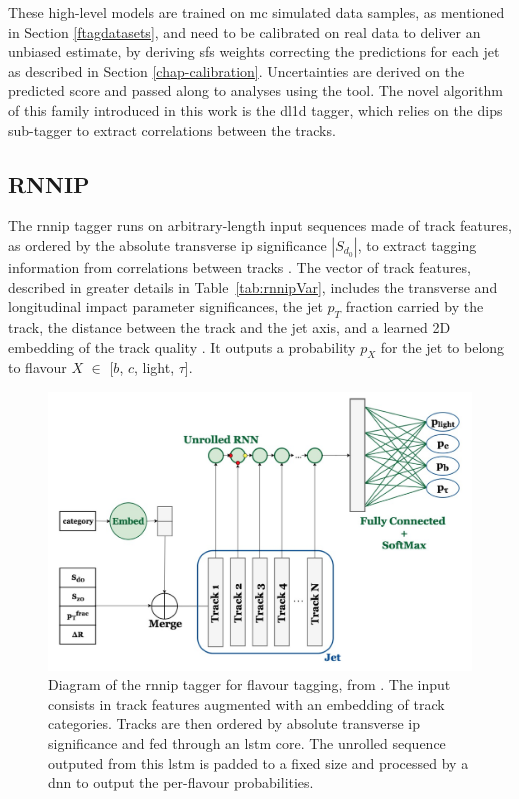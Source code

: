 These high-level models are trained on \gls{mc} simulated data samples, as mentioned in Section \ref{ftagdatasets}, and need to be calibrated on real data to deliver an unbiased estimate, by deriving \glspl{sf} weights correcting the predictions for each jet as described in Section \ref{chap-calibration}. Uncertainties are derived on the predicted score and passed along to analyses using the tool. The novel algorithm of this family introduced in this work is the \gls{dl1d} tagger, which relies on the \gls{dips} sub-tagger to extract correlations between the tracks.  

\subsection{RNNIP}
The \gls{rnnip} tagger runs on arbitrary-length input sequences made of track features, as ordered by the absolute transverse \gls{ip} significance $|S_{d_0}|$, to extract tagging information from correlations between tracks \cite{ATL-PHYS-PUB-2017-003}. The vector of track features, described in greater details in Table~\ref{tab:rnnipVar}, includes the transverse and longitudinal impact parameter significances, the jet $p_T$ fraction carried by the track, the distance between the track and the jet axis, and a learned 2D embedding of the track quality \cite{Paganini:2289214}. It outputs a probability $p_X$ for the jet to belong to flavour $X$ $\in$ [$b$, $c$, light, $\tau$].

\begin{figure}[h!]
  \center
  \includegraphics[scale=0.6]{Images/FTAG/rnnip_structure.png}
  \caption{Diagram of the \gls{rnnip} tagger for flavour tagging, from \cite{Paganini:2289214}. The input consists in track features augmented with an embedding of track categories. Tracks are then ordered by absolute transverse \gls{ip} significance and fed through an \gls{lstm} core. The unrolled sequence outputed from this \gls{lstm} is padded to a fixed size and processed by a \gls{dnn} to output the per-flavour probabilities.} 
  \label{fig:rnnipModel}
\end{figure}


